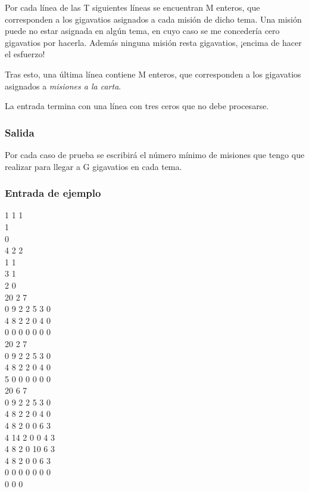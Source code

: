 \documentclass{article}
\newenvironment{caja}{
	\begingroup
	\ttfamily\noindent
	\tabularx{\linewidth}{|X|}\hline
}
{
	\hline\endtabularx
	\normalfont
	\endgroup
}
\begin{document}
	Por cada línea de las T siguientes líneas se encuentran M enteros, que corresponden a los gigavatios asignados a cada misión de dicho tema. Una misión puede no estar asignada en algún tema, en cuyo caso se me concedería cero gigavatios por hacerla. Además ninguna misión resta gigavatios, ¡encima de hacer el esfuerzo!
	
	Tras esto, una última línea contiene M enteros, que corresponden a los gigavatios asignados a \textit{misiones a la carta}.
	
	La entrada termina con una línea con tres ceros que no debe procesarse.\\
	
	\subsubsection*{Salida}
	Por cada caso de prueba se escribirá el número mínimo de misiones que tengo que realizar para llegar a G gigavatios en cada tema.\\
	
	\subsubsection*{Entrada de ejemplo}
	\begin{caja}
		1 1 1\\
		1\\
		0\\
		4 2 2\\
		1 1\\
		3 1\\
		2 0\\
		20 2 7\\
		0 9 2 2 5 3 0\\
		4 8 2 2 0 4 0\\
		0 0 0 0 0 0 0\\
		20 2 7\\
		0 9 2 2 5 3 0\\
		4 8 2 2 0 4 0\\
		5 0 0 0 0 0 0\\
		20 6 7\\
		0 9 2 2 5 3 0\\
		4 8 2 2 0 4 0\\
		4 8 2 0 0 6 3\\
		4 14 2 0 0 4 3\\
		4 8 2 0 10 6 3\\
		4 8 2 0 0 6 3\\
		0 0 0 0 0 0 0\\
		0 0 0\\
	\end{caja}\\
	
\end{document}
